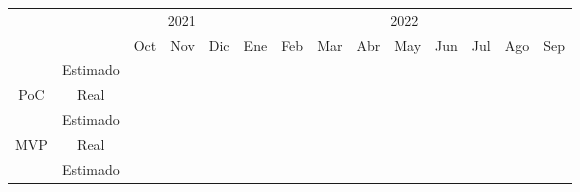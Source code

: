 \documentclass{subfiles}
\begin{document}
\begin{table}[ht]
\centering
\begin{tabular}{|cc|ccc|ccccccccc|}
\hline
\multicolumn{2}{|c|}{} & \multicolumn{3}{c|}{2021} & \multicolumn{9}{c|}{2022} \\ \cline{3-14} 
\multicolumn{2}{|c|}{\multirow{-2}{*}{}} & \multicolumn{1}{c|}{Oct} & \multicolumn{1}{c|}{Nov} & Dic & \multicolumn{1}{c|}{Ene} & \multicolumn{1}{c|}{Feb} & \multicolumn{1}{c|}{Mar} & \multicolumn{1}{c|}{Abr} & \multicolumn{1}{c|}{May} & \multicolumn{1}{c|}{Jun} & \multicolumn{1}{c|}{Jul} & \multicolumn{1}{c|}{Ago} & Sep \\ \hline
\multicolumn{1}{|c|}{} & Estimado & \multicolumn{1}{c|}{\cellcolor[HTML]{656565}} & \multicolumn{1}{c|}{\cellcolor[HTML]{656565}} & \cellcolor[HTML]{656565} & \multicolumn{1}{c|}{} & \multicolumn{1}{c|}{} & \multicolumn{1}{c|}{} & \multicolumn{1}{c|}{} & \multicolumn{1}{c|}{} & \multicolumn{1}{c|}{} & \multicolumn{1}{c|}{} & \multicolumn{1}{c|}{} &  \\ \cline{2-14} 
\multicolumn{1}{|c|}{\multirow{-2}{*}{PoC}} & Real & \multicolumn{1}{c|}{\cellcolor[HTML]{C0C0C0}} & \multicolumn{1}{c|}{\cellcolor[HTML]{C0C0C0}} & \cellcolor[HTML]{C0C0C0} & \multicolumn{1}{c|}{\cellcolor[HTML]{C0C0C0}} & \multicolumn{1}{c|}{} & \multicolumn{1}{c|}{} & \multicolumn{1}{c|}{} & \multicolumn{1}{c|}{} & \multicolumn{1}{c|}{} & \multicolumn{1}{c|}{} & \multicolumn{1}{c|}{} &  \\ \hline
\multicolumn{1}{|c|}{} & Estimado & \multicolumn{1}{c|}{} & \multicolumn{1}{c|}{} & \cellcolor[HTML]{656565} & \multicolumn{1}{c|}{\cellcolor[HTML]{656565}} & \multicolumn{1}{c|}{\cellcolor[HTML]{656565}} & \multicolumn{1}{c|}{\cellcolor[HTML]{656565}} & \multicolumn{1}{c|}{} & \multicolumn{1}{c|}{} & \multicolumn{1}{c|}{} & \multicolumn{1}{c|}{} & \multicolumn{1}{c|}{} &  \\ \cline{2-14} 
\multicolumn{1}{|c|}{\multirow{-2}{*}{MVP}} & Real & \multicolumn{1}{c|}{} & \multicolumn{1}{c|}{} &  & \multicolumn{1}{c|}{\cellcolor[HTML]{C0C0C0}} & \multicolumn{1}{c|}{\cellcolor[HTML]{C0C0C0}} & \multicolumn{1}{c|}{\cellcolor[HTML]{C0C0C0}} & \multicolumn{1}{c|}{\cellcolor[HTML]{C0C0C0}} & \multicolumn{1}{c|}{\cellcolor[HTML]{C0C0C0}} & \multicolumn{1}{c|}{\cellcolor[HTML]{C0C0C0}} & \multicolumn{1}{c|}{} & \multicolumn{1}{c|}{} &  \\ \hline
\multicolumn{1}{|c|}{} & Estimado & \multicolumn{1}{c|}{} & \multicolumn{1}{c|}{} &  & \multicolumn{1}{c|}{} & \multicolumn{1}{c|}{} & \multicolumn{1}{c|}{\cellcolor[HTML]{656565}} & \multicolumn{1}{c|}{\cellcolor[HTML]{656565}} & \multicolumn{1}{c|}{\cellcolor[HTML]{656565}} & \multicolumn{1}{c|}{\cellcolor[HTML]{656565}} & \multicolumn{1}{c|}{\cellcolor[HTML]{656565}} & \multicolumn{1}{c|}{\cellcolor[HTML]{656565}} & \cellcolor[HTML]{656565} \\ \cline{2-14} 

\end{tabular}
\end{table}
\end{document}
